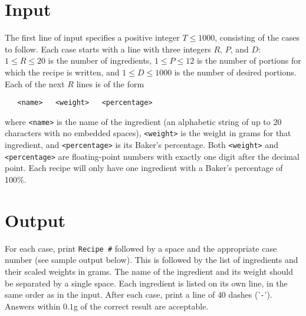 \section*{Input}

The first line of input specifies a positive integer $T \leq 1000$,
consisting of the cases to follow.  Each case starts with a line with
three integers $R$, $P$, and $D$: $1 \leq R \leq 20$ is the number of
ingredients, $1 \leq P \leq 12$ is the number of portions for which
the recipe is written, and $1 \leq D \leq 1000$ is the number of
desired portions.  Each of the next $R$ lines is of the form 
\begin{verbatim}
   <name>   <weight>   <percentage>
\end{verbatim}
where \verb|<name>| is the name of the ingredient (an alphabetic
string of up to $20$ characters with no embedded spaces),
\verb|<weight>| is the weight in grams for that ingredient, and
\verb|<percentage>| is its Baker's percentage.  Both \verb|<weight>|
and \verb|<percentage>| are floating-point numbers with exactly one
digit after the decimal point.  Each recipe will only have one
ingredient with a Baker's percentage of 100\%.

\section*{Output}

For each case, print \verb|Recipe #| followed by a space and the 
appropriate case number (see sample output below).  This is followed by 
the list of ingredients and their scaled weights in grams.
The name of the ingredient and its weight should be separated
by a single space.  Each ingredient is listed on its own line, in the
same order as in the input.  After each case, print a line of $40$
dashes ('\verb|-|').  Answers within $0.1$g of the correct result are
acceptable.
